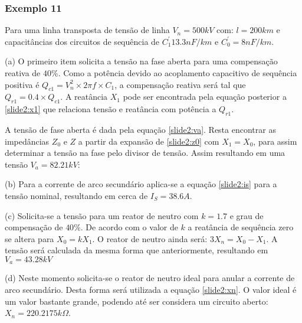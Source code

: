 \subsubsection*{Exemplo 11}

Para uma linha transposta de tensão de linha $V_n = 500kV$ com: $l=200 km$ e capacitâncias dos circuitos de sequência de $C_1^{'} 13.3 nF/km$ e $C_0^{'} = 8 nF/km$.

(a) O primeiro item solicita a tensão na fase aberta para uma compensação reativa de $40\%$. Como a potência devido ao acoplamento capacitivo de sequência positiva é $Q_{c1} = V_n^2\times 2\pi f \times C_1$, a compensação reativa será tal que $Q_{r1} = 0.4\times Q_{c1}$. A reatância $X_1$ pode ser encontrada pela equação posterior a \ref{slide2:x1} que relaciona tensão e reatância com potência a $Q_{r1}$.

A tensão de fase aberta é dada pela equação \ref{slide2:va}. Resta encontrar as impedâncias $Z_0$ e $Z$ a partir da expansão de \ref{slide2:z0} com $X_1=X_0$, para assim determinar a tensão na fase pelo divisor de tensão. Assim resultando em uma tensão $V_a = 82.21kV$:



(b) Para a corrente de arco secundário aplica-se a equação \ref{slide2:is} para a tensão nominal, resultando em cerca de $I_S = 38.6 A$.



(c) Solicita-se a tensão para um reator de neutro com $k=1.7$ e grau de compensação de $40\%$. De acordo com o valor de $k$ a reatância de sequência zero se altera para $X_0 = kX_1$. O reator de neutro ainda será: $3X_n = X_0-X_1$. A tensão será calculada da mesma forma que anteriormente, resultando em $V_a = 43.28kV$



(d) Neste momento solicita-se o reator de neutro ideal para anular a corrente de arco secundário. Desta forma será utilizada a equação \ref{slide2:xn}. O valor ideal é um valor bastante grande, podendo até ser considera um circuito aberto: $X_n = 220.2175 k \Omega$.



